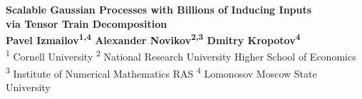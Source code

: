 \documentclass[a0,portrait]{a0poster}
\begin{document}


\begin{minipage}[b]{1.\linewidth}
  \begin{center}
  \veryHuge \color{NavyBlue} 
    \textbf{Scalable Gaussian Processes with Billions of Inducing Inputs \\via Tensor Train Decomposition} \color{Black}\\ %
\huge \textbf{Pavel Izmailov\textsuperscript{1,4} \quad Alexander Novikov\textsuperscript{2,3} \quad Dmitry Kropotov\textsuperscript{4}}\\[0.5cm] %
\Large \textsuperscript{1} Cornell University 
  \quad 
  \textsuperscript{2} National Research University Higher School of Economics\\
  \quad 
  \textsuperscript{3} Institute of Numerical Mathematics RAS
  \quad 
  \textsuperscript{4} Lomonosov Moscow State University
  \\[0.4cm] %
\end{center}
\end{minipage}
%

\vspace{1cm} %
\large

\end{document}
